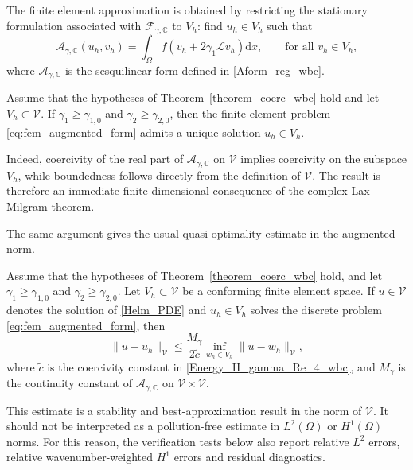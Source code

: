 \documentclass[twoside,11pt]{article}
\def\d{{\mathrm d}}
\def\C{{\mathbb C}}
\def\L{{\mathscr{L}}}
\newcommand{\qp}[1]{\ensuremath{\!\left({#1}\right)}}
\def\Vc{{\mathscr V}}
\def\L{{\mathscr{L}}}
\begin{document}
{The finite element approximation is obtained by restricting the stationary formulation associated with $\mathcal{F}_{\gamma,\C}$ to $V_h$: find $u_h\in V_h$ such that
\begin{equation}
\label{eq:fem_augmented_form}
\mathcal{A}_{\gamma,\C}(u_h,v_h)
=
\int_{\Omega} f \overline{\qp{v_h+2\gamma_1\L v_h}} \d x,
\qquad
\text{for all } v_h\in V_h,
\end{equation}
where $\mathcal{A}_{\gamma,\C}$ is the sesquilinear form defined in \eqref{Aform_reg_wbc}. 

\begin{proposition}
\label{prop:fem_wellposed}
Assume that the hypotheses of Theorem~\ref{theorem_coerc_wbc} hold and let $V_h\subset\Vc$. If $\gamma_1\ge \gamma_{1,0}$ and $\gamma_2\ge \gamma_{2,0}$, then the finite element problem \eqref{eq:fem_augmented_form} admits a unique solution $u_h\in V_h$.
\end{proposition}

Indeed, coercivity of the real part of $\mathcal{A}_{\gamma,\C}$ on $\Vc$ implies coercivity on the subspace $V_h$, while boundedness follows directly from the definition of $\Vc$. The result is therefore an immediate finite-dimensional consequence of the complex Lax--Milgram theorem.

The same argument gives the usual quasi-optimality estimate in the augmented norm.

\begin{theorem}
\label{thm:fem_quasioptimal}
Assume that the hypotheses of Theorem~\ref{theorem_coerc_wbc} hold, and let
$\gamma_1\ge \gamma_{1,0}$ and $\gamma_2\ge \gamma_{2,0}$. Let
$V_h\subset\Vc$ be a conforming finite element space. If $u\in\Vc$ denotes
the solution of \eqref{Helm_PDE} and $u_h\in V_h$ solves the discrete problem
\eqref{eq:fem_augmented_form}, then
\begin{equation}
\label{eq:fem_quasioptimal}
\|u-u_h\|_{\Vc}
\le
\frac{M_\gamma}{2\tilde c}
\inf_{w_h\in V_h}\|u-w_h\|_{\Vc},
\end{equation}
where $\tilde c$ is the coercivity constant in
\eqref{Energy_H_gamma_Re_4_wbc}, and $M_\gamma$ is the continuity constant of
$\mathcal{A}_{\gamma,\C}$ on $\Vc\times\Vc$.
\end{theorem}

This estimate is a stability and best-approximation result in the %
norm of $\Vc$. It should not be interpreted as a pollution-free estimate in  $L^2(\Omega)$ or $H^1(\Omega)$ norms. For this reason, the verification tests below also report relative $L^2$ errors, relative wavenumber-weighted $H^1$ errors and residual diagnostics.

}
\end{document}
